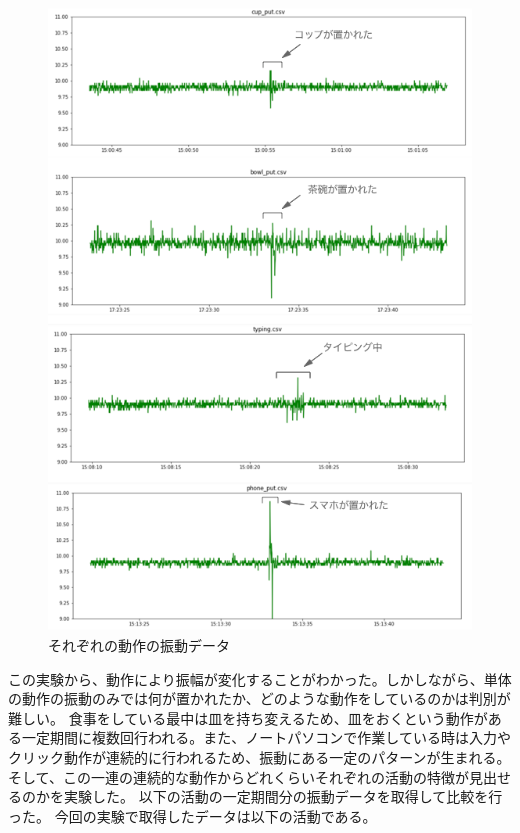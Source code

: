 \begin{figure}[htbp]
  \caption{それぞれの動作の振動データ}
  \label{fig:actions_vibration}
  \begin{center}
    \includegraphics[bb=0 0 700 800,width=20cm]{assets/actions_vibration.png}
  \end{center}
\end{figure}

この実験から、動作により振幅が変化することがわかった。しかしながら、単体の動作の振動のみでは何が置かれたか、どのような動作をしているのかは判別が難しい。
食事をしている最中は皿を持ち変えるため、皿をおくという動作がある一定期間に複数回行われる。また、ノートパソコンで作業している時は入力やクリック動作が連続的に行われるため、振動にある一定のパターンが生まれる。
そして、この一連の連続的な動作からどれくらいそれぞれの活動の特徴が見出せるのかを実験した。
以下の活動の一定期間分の振動データを取得して比較を行った。
今回の実験で取得したデータは以下の活動である。

